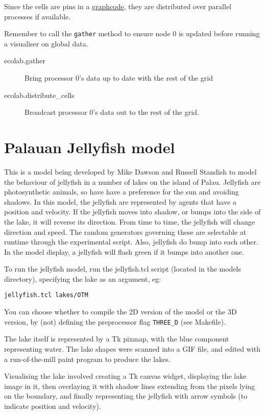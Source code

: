 Since the cells are pins in a \hyperref{graphcode Graph}{graphcode
  Graph (\S}{)}{graphcode}, they are distributed over
parallel processes if available.

Remember to call the \verb+gather+ method to ensure node
0 is updated before running a visualiser on global data.

\begin{description}
\item[ecolab.gather] Bring processor 0's data up to date with the rest
  of the grid
\item[ecolab.distribute\_cells] Broadcast processor 0's data out to the
  rest of the grid.
\end{description}

\section{Palauan Jellyfish model}\label{jellyfish}

This is a model being developed by Mike Dawson and Russell Standish to
model the behaviour of jellyfish in a number of lakes on the island of
Palau. Jellyfish are photosynthetic animals, so have have a preference
for the sun and avoiding shadows. In this model, the jellyfish are
represented by agents that have a position and velocity. If the
jellyfish moves into shadow, or bumps into the side of the lake, it
will reverse its direction. From time to time, the jellyfish will
change direction and speed. The random generators governing these are
selectable at runtime through the experimental script. Also, jellyfish
do bump into each other. In the model display, a jellyfish will flash
green if it bumps into another one.

To run the jellyfish model, run the jellyfish.tcl script (located in
the models directory), specifying the lake as an argument, eg:
\begin{verbatim}
jellyfish.tcl lakes/OTM
\end{verbatim}

You can choose whether to compile the 2D version of the model or the
3D version, by (not) defining the preprocessor flag
\verb+THREE_D+ (see Makefile).

The lake itself is represented by a Tk pixmap, with the blue component
representing water. The lake shapes were scanned into a GIF file, and
edited with a run-of-the-mill paint program to produce the lakes.

Visualising the lake involved creating a Tk canvas widget, displaying
the lake image in it, then overlaying it with shadow lines extending
from the pixels lying on the boundary, and finally representing the
jellyfish with arrow symbols (to indicate position and velocity).

